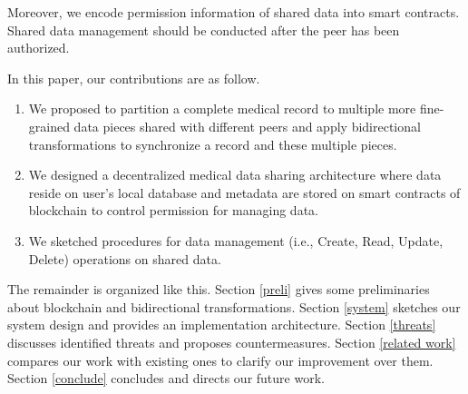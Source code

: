 \documentclass[conference]{IEEEtran}
\begin{document}

Moreover,  we encode permission information of shared data into smart contracts. Shared data management should be conducted after the peer has been authorized. 




In this paper, our contributions are as follow.
\begin{enumerate}

    \item We proposed to partition a complete medical record to multiple more fine-grained data pieces shared with different peers and apply bidirectional transformations to synchronize a record and these multiple pieces.
    
    \item We designed a decentralized medical data sharing architecture where data reside on user's local database and metadata are stored on smart contracts of blockchain to control permission for managing data.
        
    \item We sketched procedures for data management (i.e., Create, Read, Update, Delete) operations on shared data.
    

\end{enumerate}

The remainder is organized like this. Section \ref{preli} gives some preliminaries about blockchain and bidirectional transformations. Section \ref{system} sketches our system design and provides an implementation architecture. Section \ref{threats} discusses identified threats and proposes countermeasures. Section \ref{related work} compares our work with existing ones to clarify our improvement over them. Section \ref{conclude} concludes and directs our future work.
\end{document}
